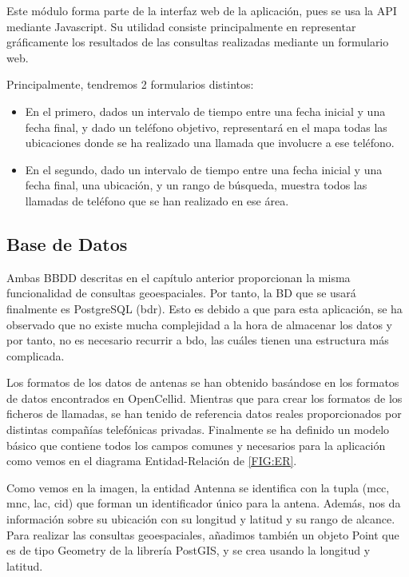     Este módulo forma parte de la interfaz web de la aplicación, pues se usa la API mediante Javascript. Su utilidad consiste principalmente en representar gráficamente los resultados de las consultas realizadas mediante un formulario web.
    
    Principalmente, tendremos 2 formularios distintos:
    \begin{itemize}
      \item En el primero, dados un intervalo de tiempo entre una fecha inicial y una fecha final, y dado un teléfono objetivo, representará en el mapa todas las ubicaciones donde se ha realizado una llamada que involucre a ese teléfono.
      
      \item En el segundo, dado un intervalo de tiempo entre una fecha inicial y una fecha final, una ubicación, y un rango de búsqueda, muestra todos las llamadas de teléfono que se han realizado en ese área. 
    \end{itemize}
    
  \subsection{Base de Datos}
    Ambas BBDD descritas en el capítulo anterior proporcionan la misma funcionalidad de consultas geoespaciales.
    Por tanto, la BD que se usará finalmente es PostgreSQL (\ac{bdr}). Esto es debido a que para esta aplicación, se ha observado que no existe mucha complejidad a la hora de almacenar los datos y por tanto, no es necesario recurrir a \ac{bdo}, las cuáles tienen una estructura más complicada. 

    Los formatos de los datos de antenas se han obtenido basándose en los formatos de datos encontrados en OpenCellid\cite{opencellid}.
    Mientras que para crear los formatos de los ficheros de llamadas, se han tenido de referencia datos reales proporcionados por distintas compañías telefónicas privadas.
    Finalmente se ha definido un modelo básico que contiene todos los campos comunes y necesarios para la aplicación como vemos en el diagrama Entidad-Relación de \ref{FIG:ER}.
    
    Como vemos en la imagen, la entidad Antenna se identifica con la tupla (mcc, mnc, lac, cid) que forman un identificador único para la antena. Además, nos da información sobre su ubicación con su longitud y latitud y su rango de alcance. Para realizar las consultas geoespaciales, añadimos también un objeto Point que es de tipo Geometry de la librería PostGIS, y se crea usando la longitud y latitud.
    
